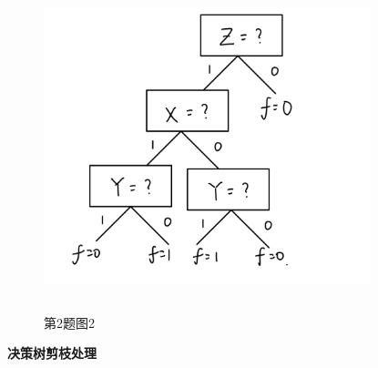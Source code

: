 \documentclass[answers]{exam}  %
\begin{document}
\begin{questions}
\begin{solution}
\begin{enumerate}
\begin{figure}[H]
                      \includegraphics[width=9.5cm,height=9.5cm]{IMG_0162.png}
                      \caption{第2题图2}
                  \end{figure}
        \end{enumerate}
    \end{solution}


    \question [25] \textbf{决策树剪枝处理} \label{ch4_prob:prunning}


\end{questions}
\end{document}
